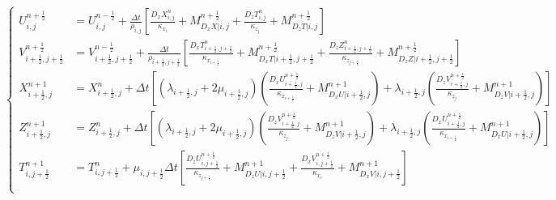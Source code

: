 \documentclass[10pt]{SelfArx} %
\theoremstyle{definition}
\begin{document}
\begin{equation}\label{eq:elastic_discretized_written_out}
\left\{
\begin{aligned}
U_{i,j}^{n+\frac{1}{2}}  &= U_{i,j}^{n-\frac{1}{2}} + \frac{\Delta t}{\rho_{i,j}}\left[ \frac{D_xX_{i,j}^n}{\kappa_{x_i}} + M_{D_xX|i,j}^{n+\frac{1}{2}} + \frac{D_zT^n_{i,j}}{\kappa_{z_j}} + M_{D_zT|i,j}^{n+\frac{1}{2}}\right] \\
V_{i+\frac{1}{2},j+\frac{1}{2}}^{n+\frac{1}{2}}  &= V_{i+\frac{1}{2},j+\frac{1}{2}}^{n-\frac{1}{2}} + \frac{\Delta t}{\rho_{i+\frac{1}{2},j+\frac{1}{2}}}\left[ \frac{D_xT_{i+\frac{1}{2},j+\frac{1}{2}}^n}{\kappa_{x_{i+\frac{1}{2}}}} + M_{D_xT|i + \frac{1}{2},j + \frac{1}{2}}^{n+\frac{1}{2}} + \frac{D_zZ^n_{i+\frac{1}{2},j+\frac{1}{2}}}{\kappa_{z_{j+\frac{1}{2}}}} + M_{D_zZ|i + \frac{1}{2},j + \frac{1}{2}}^{n+\frac{1}{2}}\right] \\
X_{i+\frac{1}{2},j}^{n+1}  &= X_{i+\frac{1}{2},j}^{n} + \Delta t\left[ \left(\lambda_{i+\frac{1}{2},j} + 2 \mu_{i+\frac{1}{2},j}\right)\left(\frac{D_xU_{i+\frac{1}{2},j}^{n+\frac{1}{2}}}{\kappa_{x_{i+\frac{1}{2}}}} + M_{D_xU|i + \frac{1}{2},j}^{n+1}\right) + \lambda_{i+\frac{1}{2},j} \left(\frac{D_zV^{n+\frac{1}{2}}_{i+\frac{1}{2},j}}{\kappa_{z_j}}+ M_{D_zV|i + \frac{1}{2},j}^{n+1}\right)\right] \\
Z_{i+\frac{1}{2},j}^{n+1}  &= Z_{i+\frac{1}{2},j}^{n} + \Delta t\left[ \left(\lambda_{i+\frac{1}{2},j} + 2 \mu_{i+\frac{1}{2},j}\right)\left(\frac{D_zV_{i+\frac{1}{2},j}^{n+\frac{1}{2}}}{\kappa_{z_j}} + M_{D_zV|i + \frac{1}{2},j}^{n+1}\right) + \lambda_{i+\frac{1}{2},j}\left(\frac{D_xU^{n+\frac{1}{2}}_{i+\frac{1}{2},j}}{\kappa_{x_{i+\frac{1}{2}}}} + M_{D_xU|i + \frac{1}{2},j}^{n+1}\right)\right] \\
T_{i,j+\frac{1}{2}}^{n+1}  &= T_{i,j+\frac{1}{2}}^{n} + \mu_{i,j+\frac{1}{2}}\Delta t\left[ \frac{D_zU_{i,j+\frac{1}{2}}^{n+\frac{1}{2}}}{\kappa_{z_{j+\frac{1}{2}}}}  + M_{D_zU|i,j+\frac{1}{2}}^{n+1} + \frac{D_xV^{n+\frac{1}{2}}_{i,j+\frac{1}{2}}}{\kappa_{x_i}} + M_{D_xV|i,j+\frac{1}{2}}^{n+1}\right] \\
\end{aligned}\right.
\end{equation}
\end{document}
